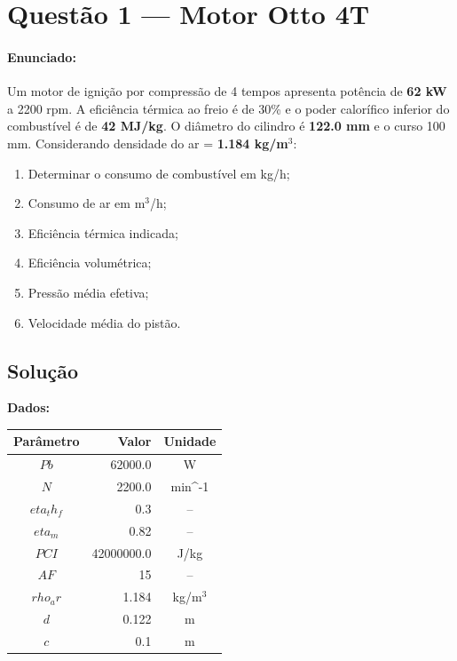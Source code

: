 \newpage
\section*{Questão 1 — Motor Otto 4T}
\label{sec:q_1}
\vspace{{10pt}}
\begin{{minipage}}{{\textwidth}}
\small
\paragraph{{Enunciado:}}
\begin{{verbatim}}
Um motor de ignição por compressão de 4 tempos apresenta potência de 
\textbf{62 kW} a 2200 rpm. A eficiência térmica ao freio é de 30\% e 
o poder calorífico inferior do combustível é de \textbf{42 MJ/kg}. 
O diâmetro do cilindro é \textbf{122.0 mm} e o curso 100 mm. 
Considerando densidade do ar = \textbf{1.184 kg/m$^3$}:

\begin{enumerate}
\item Determinar o consumo de combustível em kg/h;
\item Consumo de ar em m$^3$/h;  
\item Eficiência térmica indicada;
\item Eficiência volumétrica;
\item Pressão média efetiva;
\item Velocidade média do pistão.
\end{enumerate}

\end{{verbatim}}
\end{{minipage}}
\vspace{{15pt}}
\subsection*{Solução}
\noindent\textbf{Dados:}\\[5pt]
\begin{center}
\begin{tabular}{|c|r|c|} \hline
\textbf{Parâmetro} & \textbf{Valor} & \textbf{{Unidade}} \\ \hline\hline
$Pb$ & 62000.0 & W \\ \hline
$N$ & 2200.0 & min^{-1} \\ \hline
$eta_th_f$ & 0.3 & -- \\ \hline
$eta_m$ & 0.82 & -- \\ \hline
$PCI$ & 42000000.0 & J/kg \\ \hline
$AF$ & 15 & -- \\ \hline
$rho_ar$ & 1.184 & kg/m$^3$ \\ \hline
$d$ & 0.122 & m \\ \hline
$c$ & 0.1 & m \\ \hline
\end{tabular}
\end{center}\\[10pt]
